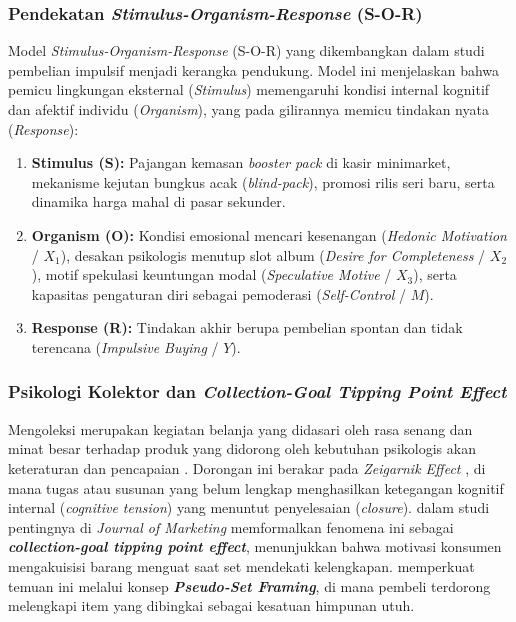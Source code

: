 \documentclass[12pt,a4paper]{article}
\numberwithin{equation}{section}
\numberwithin{table}{section}
\numberwithin{figure}{section}
\begin{document}
\subsubsection{Pendekatan \emph{Stimulus-Organism-Response} (S-O-R)}

Model \emph{Stimulus-Organism-Response} (S-O-R) yang dikembangkan \citet{huo2023exploring} dalam studi pembelian impulsif menjadi kerangka pendukung. Model ini menjelaskan bahwa pemicu lingkungan eksternal (\emph{Stimulus}) memengaruhi kondisi internal kognitif dan afektif individu (\emph{Organism}), yang pada gilirannya memicu tindakan nyata (\emph{Response}):
\begin{enumerate}
  \item \textbf{Stimulus (S):} Pajangan kemasan \emph{booster pack} di kasir minimarket, mekanisme kejutan bungkus acak (\emph{blind-pack}), promosi rilis seri baru, serta dinamika harga mahal di pasar sekunder.
  \item \textbf{Organism (O):} Kondisi emosional mencari kesenangan (\emph{Hedonic Motivation} / $X_1$), desakan psikologis menutup slot album (\emph{Desire for Completeness} / $X_2$), motif spekulasi keuntungan modal (\emph{Speculative Motive} / $X_3$), serta kapasitas pengaturan diri sebagai pemoderasi (\emph{Self-Control} / $M$).
  \item \textbf{Response (R):} Tindakan akhir berupa pembelian spontan dan tidak terencana (\emph{Impulsive Buying} / $Y$).
\end{enumerate}

\subsubsection{Psikologi Kolektor dan \emph{Collection-Goal Tipping Point Effect}}

Mengoleksi merupakan kegiatan belanja yang didasari oleh rasa senang dan minat besar terhadap produk yang didorong oleh kebutuhan psikologis akan keteraturan dan pencapaian \citep{belk1995collecting}. Dorongan ini berakar pada \emph{Zeigarnik Effect} \citep{zeigarnik1927behalten}, di mana tugas atau susunan yang belum lengkap menghasilkan ketegangan kognitif internal (\emph{cognitive tension}) yang menuntut penyelesaian (\emph{closure}). \citet{gao2014completing} dalam studi pentingnya di \emph{Journal of Marketing} memformalkan fenomena ini sebagai \textbf{\emph{collection-goal tipping point effect}}, menunjukkan bahwa motivasi konsumen mengakuisisi barang menguat saat set mendekati kelengkapan. \citet{barasz2017pseudo} memperkuat temuan ini melalui konsep \textbf{\emph{Pseudo-Set Framing}}, di mana pembeli terdorong melengkapi item yang dibingkai sebagai kesatuan himpunan utuh.
\end{document}
